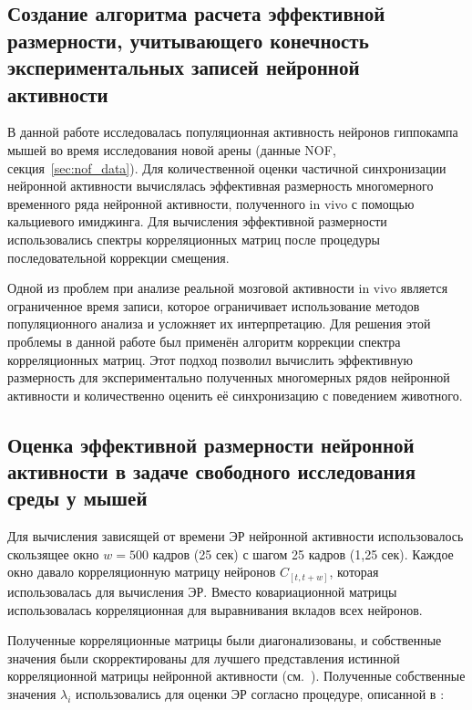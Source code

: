 \subsection{Создание алгоритма расчета эффективной размерности, учитывающего конечность экспериментальных записей нейронной активности}

В данной работе исследовалась популяционная активность нейронов гиппокампа мышей во время исследования новой арены (данные NOF, секция~\ref{sec:nof_data}). Для количественной оценки частичной синхронизации нейронной активности вычислялась эффективная размерность многомерного временного ряда нейронной активности, полученного in vivo с помощью кальциевого имиджинга. Для вычисления эффективной размерности использовались спектры корреляционных матриц после процедуры последовательной коррекции смещения. 

Одной из проблем при анализе реальной мозговой активности in vivo является ограниченное время записи, которое ограничивает использование методов популяционного анализа и усложняет их интерпретацию. Для решения этой проблемы в данной работе был применён алгоритм коррекции спектра корреляционных матриц. Этот подход позволил вычислить эффективную размерность для экспериментально полученных многомерных рядов нейронной активности и количественно оценить её синхронизацию с поведением животного.

\subsection{Оценка эффективной размерности нейронной активности в задаче свободного исследования среды у мышей}

Для вычисления зависящей от времени ЭР нейронной активности использовалось скользящее окно $w=500$ кадров (25 сек) с шагом 25 кадров (1,25 сек). Каждое окно давало корреляционную матрицу нейронов $C_{[t, t+w]}$, которая использовалась для вычисления ЭР. Вместо ковариационной матрицы использовалась корреляционная для выравнивания вкладов всех нейронов.

Полученные корреляционные матрицы были диагонализованы, и собственные значения были скорректированы для лучшего представления истинной корреляционной матрицы нейронной активности (см.~\cite{spcorr}). Полученные собственные значения $\lambda_i$ использовались для оценки ЭР согласно процедуре, описанной в \cite{edim}:

